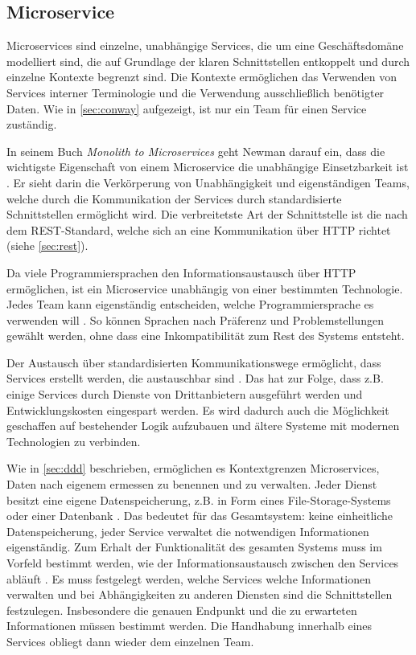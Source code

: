 \subsection{Microservice}

Microservices sind einzelne, unabhängige Services, die um eine Geschäftsdomäne modelliert sind, die auf Grundlage der klaren Schnittstellen entkoppelt und durch einzelne Kontexte begrenzt sind. Die Kontexte ermöglichen das Verwenden von Services interner Terminologie und die Verwendung ausschließlich benötigter Daten. Wie in \cref{sec:conway} aufgezeigt, ist nur ein Team für einen Service zuständig.

In seinem Buch \textit{Monolith to Microservices} geht Newman darauf ein, dass die wichtigste Eigenschaft von einem Microservice die unabhängige Einsetzbarkeit ist \parencite[vgl.][Kap. 2.1.1]{newman_monolith_2019}. Er sieht darin die Verkörperung von Unabhängigkeit und eigenständigen Teams, welche durch die Kommunikation der Services durch standardisierte Schnittstellen ermöglicht wird. Die verbreitetste Art der Schnittstelle ist die nach dem REST-Standard, welche sich an eine Kommunikation über HTTP richtet (siehe \cref{sec:rest}).
 
Da viele Programmiersprachen den Informationsaustausch über HTTP ermöglichen, ist ein Microservice unabhängig von einer bestimmten Technologie. Jedes Team kann eigenständig entscheiden, welche Programmiersprache es verwenden will \parencite[vgl.][Kap. 1.2]{wolff_microservices_2018}. So können Sprachen nach Präferenz und Problemstellungen gewählt werden, ohne dass eine Inkompatibilität zum Rest des Systems entsteht.

Der Austausch über standardisierten Kommunikationswege ermöglicht, dass Services erstellt werden, die austauschbar sind \parencite[vgl.][Kap. 1.2]{wolff_microservices_2018}. Das hat zur Folge, dass z.B. einige Services durch Dienste von Drittanbietern ausgeführt werden und Entwicklungskosten eingespart werden. Es wird dadurch auch die Möglichkeit geschaffen auf bestehender Logik aufzubauen und ältere Systeme mit modernen Technologien zu verbinden.

Wie in \cref{sec:ddd} beschrieben, ermöglichen es Kontextgrenzen Microservices, Daten nach eigenem ermessen zu benennen und zu verwalten. Jeder Dienst besitzt eine eigene Datenspeicherung, z.B. in Form eines File-Storage-Systems oder einer Datenbank \parencite[vgl.][Kap. 2.1.3]{newman_monolith_2019}. Das bedeutet für das Gesamtsystem: keine einheitliche Datenspeicherung, jeder Service verwaltet die notwendigen Informationen eigenständig. Zum Erhalt der Funktionalität des gesamten Systems muss im Vorfeld bestimmt werden, wie der Informationsaustausch zwischen den Services abläuft \parencite[vgl.][Kap. 4.1]{wolff_microservices_2018}. Es muss festgelegt werden, welche Services welche Informationen verwalten und bei Abhängigkeiten zu anderen Diensten sind die Schnittstellen festzulegen. Insbesondere die genauen Endpunkt und die zu erwarteten Informationen müssen bestimmt werden. Die Handhabung innerhalb eines Services obliegt dann wieder dem einzelnen Team. 

